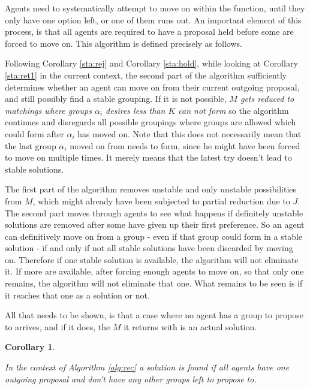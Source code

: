 \documentclass{elsarticle}
\newtheorem{mysta}{Corollary}
\begin{document}
Agents need to systematically attempt to move on within the function, until they only have one option left, or one of them runs out. An important element of this process, is that all agents are required to have a proposal held before some are forced to move on. This algorithm is defined precisely as follows.


\AlgGrouping

Following Corollary \ref{sta:rej} and Corollary \ref{sta:hold}, while looking at Corollary \ref{sta:ret1} in the current context, the second part of the algorithm sufficiently determines whether an agent can move on from their current outgoing proposal, and still possibly find a stable grouping. If it is not possible, \textit{$M$ gets reduced to matchings where groups $\alpha_i$ desires less than $K$ can not form} so the algorithm continues and disregards all possible groupings where groups are allowed which could form after $\alpha_i$ has moved on. Note that this does not necessarily mean that the last group $\alpha_i$ moved on from needs to form, since he might have been forced to move on multiple times. It merely means that the latest try doesn't lead to stable solutions.

The first part of the algorithm removes unstable and only unstable possibilities from $M$, which might already have been subjected to partial reduction due to $J$. The second part moves through agents to see what happens if definitely unstable solutions are removed after some have given up their first preference. So an agent can definitively move on from a group - even if that group could form in a stable solution - if and only if not all stable solutions have been discarded by moving on. Therefore if one stable solution is available, the algorithm will not eliminate it. If more are available, after forcing enough agents to move on, so that only one remains, the algorithm will not eliminate that one. What remains to be seen is if it reaches that one as a solution or not.

All that needs to be shown, is that a case where no agent has a group to propose to arrives, and if it does, the $M$ it returns with is an actual solution. 

\begin{mysta}
\label{sta:found}

In the context of Algorithm \ref{alg:rec} a solution is found if all agents have one outgoing proposal and don't have any other groups left to propose to.

\end{mysta}
\end{document}
